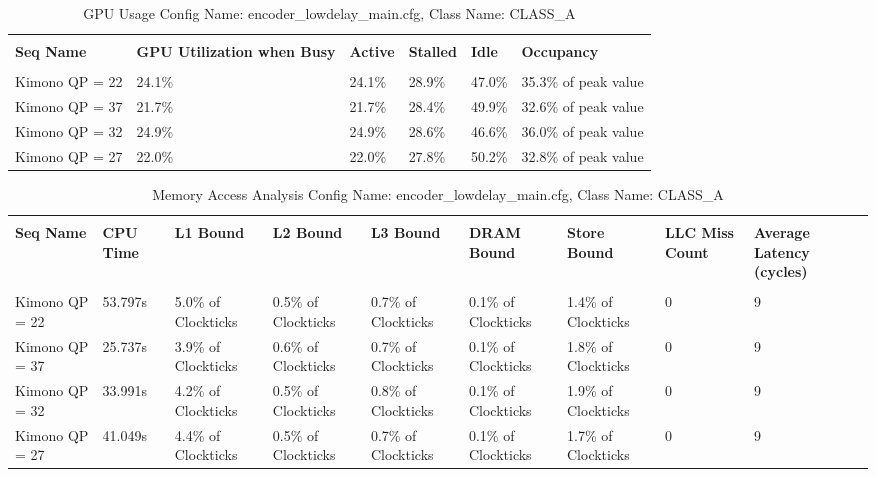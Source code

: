\documentclass{article}%
\begin{document}
\newpage%
\begin{longtabu}{| X[l] | X[l] | X[l] | X[l] | X[l] | X[l] |}%
\caption{%
GPU Usage\newline%
 Config Name: encoder\_lowdelay\_main.cfg,\newline%
 Class Name: CLASS\_A\newline%
%
}%
\hline%
&&&&&\\%
\textbf{Seq Name}&\textbf{GPU Utilization when Busy}&\textbf{Active}&\textbf{Stalled}&\textbf{Idle}&\textbf{Occupancy}\\%
&&&&&\\%
\hline%
\endhead%
Kimono\newline%
 QP = 22&24.1\%&24.1\%&28.9\%&47.0\%&35.3\% of peak value\\%
\hline%
Kimono\newline%
 QP = 37&21.7\%&21.7\%&28.4\%&49.9\%&32.6\% of peak value\\%
\hline%
Kimono\newline%
 QP = 32&24.9\%&24.9\%&28.6\%&46.6\%&36.0\% of peak value\\%
\hline%
Kimono\newline%
 QP = 27&22.0\%&22.0\%&27.8\%&50.2\%&32.8\% of peak value\\%
\hline%
\end{longtabu}%
\begin{longtabu}{| X[l] | X[l] | X[l] | X[l] | X[l] | X[l] | X[l] | X[l] | X[l] |}%
\caption{%
Memory Access Analysis\newline%
 Config Name: encoder\_lowdelay\_main.cfg,\newline%
 Class Name: CLASS\_A\newline%
%
}%
\hline%
&&&&&&&&\\%
\textbf{Seq Name}&\textbf{CPU Time}&\textbf{L1 Bound}&\textbf{L2 Bound}&\textbf{L3 Bound}&\textbf{DRAM Bound}&\textbf{Store Bound}&\textbf{LLC Miss Count}&\textbf{Average Latency (cycles)}\\%
&&&&&&&&\\%
\hline%
\endhead%
Kimono\newline%
 QP = 22&53.797s&5.0\% of Clockticks&0.5\% of Clockticks&0.7\% of Clockticks&0.1\% of Clockticks&1.4\% of Clockticks&0&9\\%
\hline%
Kimono\newline%
 QP = 37&25.737s&3.9\% of Clockticks&0.6\% of Clockticks&0.7\% of Clockticks&0.1\% of Clockticks&1.8\% of Clockticks&0&9\\%
\hline%
Kimono\newline%
 QP = 32&33.991s&4.2\% of Clockticks&0.5\% of Clockticks&0.8\% of Clockticks&0.1\% of Clockticks&1.9\% of Clockticks&0&9\\%
\hline%
Kimono\newline%
 QP = 27&41.049s&4.4\% of Clockticks&0.5\% of Clockticks&0.7\% of Clockticks&0.1\% of Clockticks&1.7\% of Clockticks&0&9\\%
\hline%
\end{longtabu}%
\end{document}
